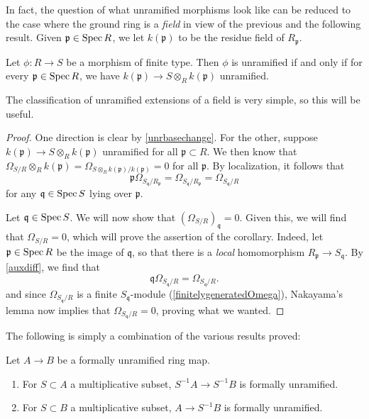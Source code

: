 In fact, the question of what unramified morphisms look like can be reduced to
the case where the ground ring is a \emph{field} in view of the previous and
the following result.
Given $\mathfrak{p} \in \operatorname{Spec} R$, we let $k(\mathfrak{p})$ to be the residue
field of $R_{\mathfrak{p}}$.


\begin{proposition} \label{reduceunrtofield} 
Let $\phi: R \to S$ be a morphism of finite type. Then $\phi$ is unramified if
and only if for every $\mathfrak{p} \in \operatorname{Spec} R$, we have
\( k(\mathfrak{p}) \to S \otimes_R k(\mathfrak{p})  \)
unramified.
\end{proposition} 
The classification of unramified extensions of a field is very simple, so this
will be useful.
\begin{proof} 
One direction is clear by \cref{unrbasechange}. For the other, suppose
$k(\mathfrak{p}) \to S \otimes_R k(\mathfrak{p})$ unramified for all $\mathfrak{p} \subset R$.
We then know that 
\( \Omega_{S/R} \otimes_R k(\mathfrak{p}) = \Omega_{S \otimes_R
k(\mathfrak{p})/k(\mathfrak{p})} = 0  \)
for all $\mathfrak{p}$. By localization, it follows that
\begin{equation} \label{auxdiff} \mathfrak{p}
\Omega_{S_{\mathfrak{q}}/R_{\mathfrak{p}}} =
\Omega_{S_{\mathfrak{q}}/R_{\mathfrak{p}}} = \Omega_{S_{\mathfrak{q}}/R}  \end{equation}
for any $\mathfrak{q} \in \operatorname{Spec} S$ lying over $\mathfrak{p}$.

Let $\mathfrak{q} \in \operatorname{Spec} S$. We will now show that
$(\Omega_{S/R})_{\mathfrak{q}} = 0$. 
Given this, we will find that $\Omega_{S/R} =0$, which will prove the
assertion of the corollary. 
Indeed, let $\mathfrak{p} \in \operatorname{Spec} R$ be
the image of $\mathfrak{q}$, so that there is a \emph{local} homomorphism 
$R_{\mathfrak{p}} \to S_{\mathfrak{q}}$. By \eqref{auxdiff}, we find that
\[ \mathfrak{q} \Omega_{S_{\mathfrak{q}}/R} = \Omega_{S_{\mathfrak{q}}/R}.  \]
and since $\Omega_{S_{\mathfrak{q}}/R}$ is a finite $S_{\mathfrak{q}}$-module
(\cref{finitelygeneratedOmega}),
Nakayama's lemma now implies that $\Omega_{S_{\mathfrak{q}}/R}=0$, proving
what we wanted. 
\end{proof} 


The following is simply a combination of the various results proved:
\begin{corollary}
\label{lemma-formally-unramified-localize}
Let $A \to B$ be a formally unramified ring map.
\begin{enumerate}
\item For $S \subset A$ a multiplicative subset,
$S^{-1}A \to S^{-1}B$ is formally unramified.
\item For $S \subset B$ a multiplicative subset,
$A \to S^{-1}B$ is formally unramified.
\end{enumerate}
\end{corollary}

